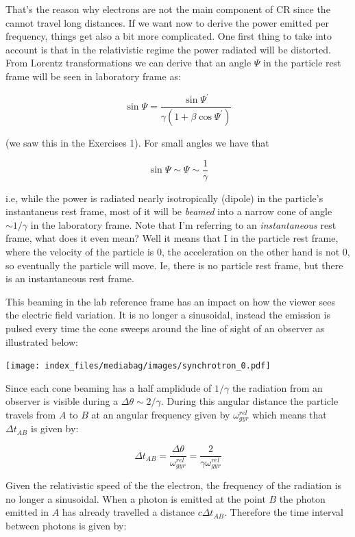 \documentclass[
  letterpaper,
  DIV=11,
  numbers=noendperiod]{scrreprt}
\begin{document}
That's the reason why electrons are not the main component of CR since
the cannot travel long distances. If we want now to derive the power
emitted per frequency, things get also a bit more complicated. One first
thing to take into account is that in the relativistic regime the power
radiated will be distorted. From Lorentz transformations we can derive
that an angle \(\Psi\) in the particle rest frame will be seen in
laboratory frame as:

\[\sin \Psi = \frac{\sin\Psi^\prime}{\gamma(1+\beta \cos\Psi^\prime)}\]

(we saw this in the Exercises 1). For small angles we have that

\[\sin \Psi \sim \Psi \sim \frac{1}{\gamma}\]

i.e, while the power is radiated nearly isotropically (dipole) in the
particle's instantaneus rest frame, most of it will be \emph{beamed}
into a narrow cone of angle \(\sim 1/\gamma\) in the laboratory frame.
Note that I'm referring to an \emph{instantaneous} rest frame, what does
it even mean? Well it means that I in the particle rest frame, where the
velocity of the particle is 0, the acceleration on the other hand is not
0, so eventually the particle will move. Ie, there is no particle rest
frame, but there is an instantaneous rest frame.

This beaming in the lab reference frame has an impact on how the viewer
sees the electric field variation. It is no longer a sinusoidal, instead
the emission is pulsed every time the cone sweeps around the line of
sight of an observer as illustrated below:

\texttt{[image: index\_files/mediabag/images/synchrotron\_0.pdf]}

Since each cone beaming has a half amplidude of \(1/\gamma\) the
radiation from an observer is visible during a
\(\Delta \theta \sim 2/\gamma\). During this angular distance the
particle travels from \(A\) to \(B\) at an angular frequency given by
\(\omega_{gyr}^{rel}\) which means that \(\Delta t_{AB}\) is given by:

\[\Delta t_{AB} = \frac{\Delta \theta}{\omega_{gyr}^{rel}} = \frac{2}{\gamma \omega_{gyr}^{rel}}\]

Given the relativistic speed of the the electron, the frequency of the
radiation is no longer a sinusoidal. When a photon is emitted at the
point \(B\) the photon emitted in \(A\) has already travelled a distance
\(c\Delta t_{AB}\). Therefore the time interval between photons is given
by:
\end{document}
